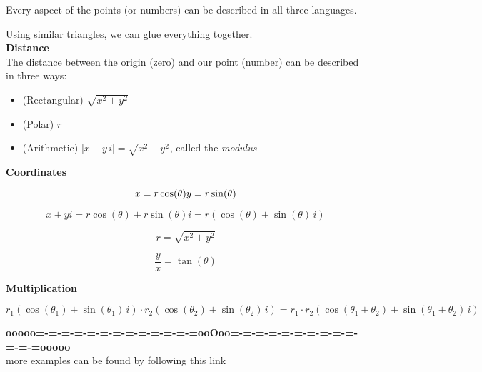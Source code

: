 \documentclass{ximera}
\begin{document}
Every aspect of the points (or numbers) can be described in all three languages.  


\qquad



Using similar triangles, we can glue everything together.  \\




\textbf{\textcolor{blue!55!black}{Distance}}  \\


The distance between the origin (zero) and our point (number) can be described in three ways:


\begin{itemize}
\item (Rectangular)  $\sqrt{x^2 + y^2}$
\item (Polar) $r$
\item (Arithmetic) $| x + y \, i  | = \sqrt{x^2 + y^2}$, called the \textit{modulus}
\end{itemize}



\qquad


\textbf{\textcolor{blue!55!black}{Coordinates}} 


\[
x = r \cos(\theta)  \\
y = r \sin(\theta)
\]


\[
x + y i = r \cos(\theta) + r \sin(\theta) i = r (\cos(\theta) +  \sin(\theta) \, i)
\]




\[
r = \sqrt{x^2 + y^2}
\]


\[
\frac{y}{x} = \tan(\theta)
\]





\qquad


\textbf{\textcolor{blue!55!black}{Multiplication}} 


\[
r_1 (\cos(\theta_1) +  \sin(\theta_1) \, i) \cdot r_2 (\cos(\theta_2) +  \sin(\theta_2) \, i) = r_1 \cdot r_2 (\cos(\theta_1 + \theta_2) +  \sin(\theta_1 + \theta_2) \, i) 
\]












\begin{center}
\textbf{\textcolor{green!50!black}{ooooo=-=-=-=-=-=-=-=-=-=-=-=-=ooOoo=-=-=-=-=-=-=-=-=-=-=-=-=ooooo}} \\

more examples can be found by following this link\\ 

\end{center}
\end{document}
